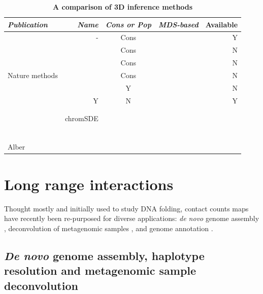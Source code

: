 \begin{table}[ht!]
\caption{\bf A comparison of 3D inference methods}
\begin{center}
\begin{tabular}{lrcrr}
\hline
\emph{Publication} & \emph{Name} & \emph{Cons or Pop} & \emph{MDS-based} & Available \\
\hline
\citet{duan:three} & - & Cons & & Y \\
\citet{tanizawa:mapping} & & Cons & & N \\
\citet{ay:three-dimensional} & & Cons & & N\\
Nature methods & & Cons & & N\\
\citet{ben-elazar:spatial} & & Y & & N \\
\citet{varoquaux:statistical} & Y & N & & Y\\
\citet{bau:three-dimensional} & & & &\\
\citet{umbarger:three-dimensional} & & & &\\
\citet{zhang:inference} & chromSDE & & &\\
\citet{rousseau:three} & & & &\\
\citet{hu:bayesian} & & & &\\
\citet{kalhor:genome} & & & &\\
\citet{tokuda:dynamical} & & & &\\
\citet{wong:predictive} & & & &\\
\citet{gehlen:chromosome} & & & &\\
Alber & & & &\\
\end{tabular}
\end{center}
\end{table}


\section{Long range interactions}


Thought mostly and initially used to study DNA folding, contact counts maps
have recently been re-purposed for diverse applications: \textit{de novo}
genome assembly \citep{burton:chromosome, kaplan:high-throughput},
deconvolution of metagenomic samples \citep{burton:species-level,
beitel:strain}, and genome annotation \citep{marie-nelly:filling,
varoquaux:accurate}.

\subsection{\textit{De novo} genome assembly, haplotype resolution and
metagenomic sample deconvolution}

